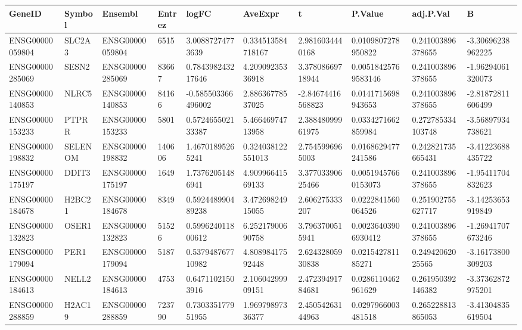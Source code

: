 \begingroup
\tiny
\setlength{\tabcolsep}{2pt}
\renewcommand{\arraystretch}{1.18}
\begin{tabular}{@{}llllllllll@{}}
\toprule
GeneID & Symbol & Ensembl & Entrez & logFC & AveExpr & t & P.Value & adj.P.Val & B \\
\midrule
ENSG00000059804 & SLC2A3 & ENSG00000059804 & 6515 & 3.00887274773639 & 0.334513584718167 & 2.9816034440168 & 0.0109807278950822 & 0.241003896378655 & -3.30696238962225 \\
ENSG00000285069 & SESN2 & ENSG00000285069 & 83667 & 0.784398243217646 & 4.20909235336918 & 3.37808669718944 & 0.00518425769583146 & 0.241003896378655 & -1.96294061320073 \\
ENSG00000140853 & NLRC5 & ENSG00000140853 & 84166 & -0.585503366496002 & 2.88636778537025 & -2.84674416568823 & 0.0141715698943653 & 0.241003896378655 & -2.81872811606499 \\
ENSG00000153233 & PTPRR & ENSG00000153233 & 5801 & 0.572465502133387 & 5.46646974713958 & 2.38848099961975 & 0.0334271662859984 & 0.272785334103748 & -3.56897934738621 \\
ENSG00000198832 & SELENOM & ENSG00000198832 & 140606 & 1.46701895265241 & 0.324038122551013 & 2.7545996965003 & 0.0168629477241586 & 0.242821735665431 & -3.41223688435722 \\
ENSG00000175197 & DDIT3 & ENSG00000175197 & 1649 & 1.73762051486941 & 4.90996641569133 & 3.37703390625466 & 0.00519457660153073 & 0.241003896378655 & -1.95411704832623 \\
ENSG00000184678 & H2BC21 & ENSG00000184678 & 8349 & 0.592448990489238 & 3.47269824915055 & 2.606275333207 & 0.0222841560064526 & 0.251902755627717 & -3.14253653919849 \\
ENSG00000132823 & OSER1 & ENSG00000132823 & 51526 & 0.599624011800612 & 6.25217900690758 & 3.7963700515941 & 0.00236403906930412 & 0.241003896378655 & -1.26941707673246 \\
ENSG00000179094 & PER1 & ENSG00000179094 & 5187 & 0.537948767710982 & 4.80898417592448 & 2.62432805930838 & 0.021542781185271 & 0.24942062025565 & -3.16173800309203 \\
ENSG00000184613 & NELL2 & ENSG00000184613 & 4753 & 0.64711021503916 & 2.10604299909151 & 2.47239491784681 & 0.0286110462961629 & 0.261950392146382 & -3.37362872975201 \\
ENSG00000288859 & H2AC19 & ENSG00000288859 & 723790 & 0.730335177951955 & 1.96979897336377 & 2.45054263144963 & 0.0297966003481518 & 0.265228813865053 & -3.41304835619504 \\

\end{tabular}

